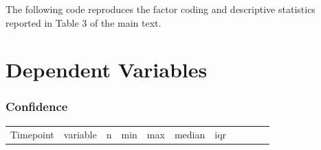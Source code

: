 \documentclass[
  letterpaper,
  DIV=11,
  numbers=noendperiod]{scrreprt}
\begin{document}
The following code reproduces the factor coding and descriptive
statistics reported in Table 3 of the main text.

\section{Dependent Variables}\label{dependent-variables}

\subsubsection{Confidence}\label{confidence}

\begin{longtable}[]{@{}
  >{\raggedright\arraybackslash}p{}
  >{\raggedright\arraybackslash}p{}
  >{\raggedleft\arraybackslash}p{}
  >{\raggedleft\arraybackslash}p{}
  >{\raggedleft\arraybackslash}p{}
  >{\raggedleft\arraybackslash}p{}
  >{\raggedleft\arraybackslash}p{}
  >{\raggedright\arraybackslash}p{}
  >{\raggedright\arraybackslash}p{}
  >{\raggedleft\arraybackslash}p{}
  >{\raggedleft\arraybackslash}p{}@{}}
\toprule\noalign{}
\begin{minipage}[b]{\linewidth}\raggedright
Timepoint
\end{minipage} & \begin{minipage}[b]{\linewidth}\raggedright
variable
\end{minipage} & \begin{minipage}[b]{\linewidth}\raggedleft
n
\end{minipage} & \begin{minipage}[b]{\linewidth}\raggedleft
min
\end{minipage} & \begin{minipage}[b]{\linewidth}\raggedleft
max
\end{minipage} & \begin{minipage}[b]{\linewidth}\raggedleft
median
\end{minipage} & \begin{minipage}[b]{\linewidth}\raggedleft
iqr
\end{minipage} & \begin{minipage}[b]{\linewidth}\raggedright

\end{minipage}
\end{longtable}
\end{document}
